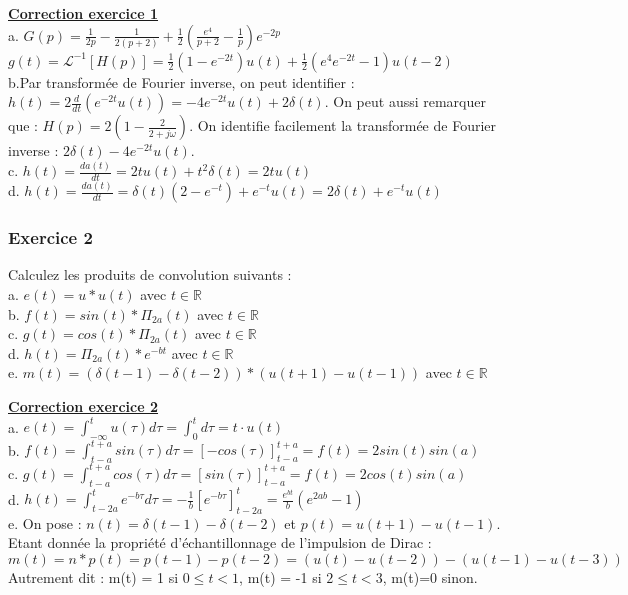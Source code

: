 \documentclass[11pt]{report}
\begin{document}
	
	\textbf{\underline{Correction exercice 1}}\\
	
	a. $G(p)=\frac{1}{2p}-\frac{1}{2(p+2)}+\frac{1}{2}(\frac{e^{4}}{p+2}-\frac{1}{p})e^{-2p}$ \\
	$g(t)=\mathcal{L}^{-1}[H(p)]=\frac{1}{2}(1-e^{-2t})u(t)+\frac{1}{2}(e^{4}e^{-2t}-1)u(t-2)$\\
	
	b.Par transformée de Fourier inverse, on peut identifier  : $h(t)=2\frac{d}{dt}(e^{-2t}u(t))=-4e^{-2t}u(t)+2\delta(t)$. On peut aussi remarquer que : $H(p)=2(1-\frac{2}{2+j\omega})$. On identifie facilement la transformée de Fourier inverse : $2\delta(t)-4e^{-2t}u(t)$.\\
	
	c. $h(t)=\frac{da(t)}{dt}=2tu(t)+t^{2}\delta(t)=2tu(t)$\\
	
	d. $h(t)=\frac{da(t)}{dt}=\delta(t)(2-e^{-t})+e^{-t}u(t)=2\delta(t)+e^{-t}u(t)$
	
	\vspace{1\baselineskip}
	
	\subsubsection{Exercice 2}
	
	Calculez les produits de convolution suivants : \\
	a. $e(t)=u*u(t)$ avec $t \in \mathbb{R}$\\
	b. $f(t)=sin(t)*\Pi_{2a}(t)$ avec $t \in \mathbb{R}$\\
	c. $g(t)=cos(t)*\Pi_{2a}(t)$ avec $t \in \mathbb{R}$\\
	d. $h(t)=\Pi_{2a}(t)*e^{-bt}$ avec $t \in \mathbb{R}$\\
	e. $m(t)=(\delta(t-1)-\delta(t-2))*(u(t+1)-u(t-1))$ avec $t \in \mathbb{R}$
	
	\vspace{1\baselineskip}
	
	\textbf{\underline{Correction exercice 2}}\\
	
	a. $e(t)=\int_{-\infty}^{t}u(\tau)d\tau=\int_{0}^{t}d\tau=t\cdot u(t)$\\
	b. $f(t)=\int_{t-a}^{t+a}sin(\tau)d\tau=[-cos(\tau)]_{t-a}^{t+a}=f(t)=2sin(t)sin(a)$\\
	c. $g(t)=\int_{t-a}^{t+a}cos(\tau)d\tau=[sin(\tau)]_{t-a}^{t+a}=f(t)=2cos(t)sin(a)$\\
	d. $h(t)=\int_{t-2a}^{t}e^{-b\tau}d\tau=-\frac{1}{b}[e^{-b\tau}]_{t-2a}^{t}=\frac{e^{bt}}{b}(e^{2ab}-1)$\\
	e. On pose : $n(t)=\delta(t-1)-\delta(t-2)$ et $p(t)=u(t+1)-u(t-1)$. Etant donnée la propriété d'échantillonnage de l'impulsion de Dirac :
	\begin{equation*}
	m(t)=n*p(t)=p(t-1)-p(t-2)=(u(t)-u(t-2))-(u(t-1)-u(t-3))
	\end{equation*}
	Autrement dit : m(t) = 1 si $0 \leq t < 1$, m(t) = -1 si $2 \leq t < 3$, m(t)=0 sinon. 
	
\end{document}

